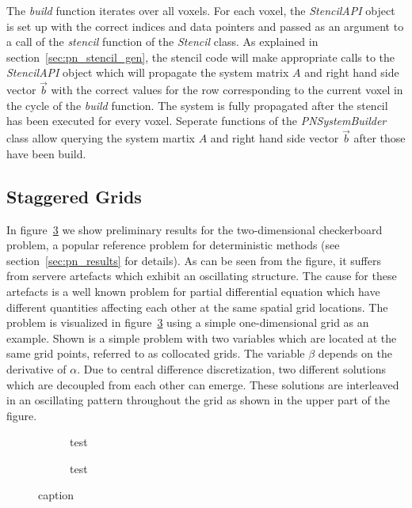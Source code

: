 The \emph{build} function iterates over all voxels. For each voxel, the \emph{StencilAPI} object is set up with the correct indices and data pointers and passed as an argument to a call of the \emph{stencil} function of the \emph{Stencil} class. As explained in section~\ref{sec:pn_stencil_gen}, the stencil code will make appropriate calls to the \emph{StencilAPI} object which will propagate the system matrix $A$ and right hand side vector $\vec{b}$ with the correct values for the row corresponding to the current voxel in the cycle of the \emph{build} function. The system is fully propagated after the stencil has been executed for every voxel. Seperate functions of the \emph{PNSystemBuilder} class allow querying the system martix $A$ and right hand side vector $\vec{b}$ after those have been build.

\subsection{Staggered Grids}
\label{sec:pn_staggered}

In figure~\ref{fig:pn_staggered_grid_problems} we show preliminary results for the two-dimensional checkerboard problem, a popular reference problem for deterministic methods (see section~\ref{sec:pn_results} for details). As can be seen from the figure, it suffers from servere artefacts which exhibit an oscillating structure. The cause for these artefacts is a well known problem for partial differential equation which have different quantities affecting each other at the same spatial grid locations. The problem is visualized in figure~\ref{fig:pn_staggered_grid_problems} using a simple one-dimensional grid as an example. Shown is a simple problem with two variables which are located at the same grid points, referred to as collocated grids. The variable $\beta$ depends on the derivative of $\alpha$. Due to central difference discretization, two different solutions which are decoupled from each other can emerge. These solutions are interleaved in an oscillating pattern throughout the grid as shown in the upper part of the figure.

\begin{figure}[h]
\centering
\begin{subfigure}{0.49\columnwidth}
\caption{test}
\label{fig:pn_collocated_grid_artefacts}
\end{subfigure}%
\hspace{0.01\columnwidth}
\begin{subfigure}{0.49\columnwidth}
\caption{test}
\label{fig:pn_staggered_grid_idea}
\end{subfigure}%
\caption{caption}
\label{fig:pn_staggered_grid_problems}
\end{figure}

